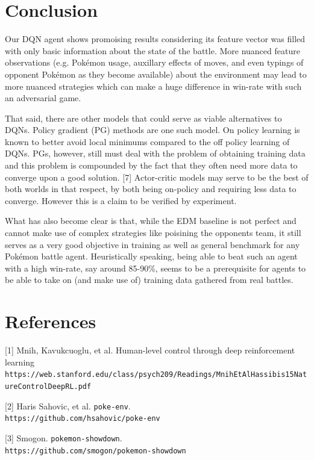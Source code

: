 \documentclass{article}
\begin{document}
\section{Conclusion}
Our DQN agent shows promoising results considering its feature vector was filled with only basic information about the state of the battle. More nuanced feature observations (e.g. Pokémon usage, auxillary effects of moves, and even typings of opponent Pokémon as they become available) about the environment may lead to more nuanced strategies which can make a huge difference in win-rate with such an adversarial game.

That said, there are other models that could serve as viable alternatives to DQNs. Policy gradient (PG) methods are one such model. On policy learning is known to better avoid local minimums compared to the off policy learning of DQNs. PGs, however, still must deal with the problem of obtaining training data and this problem is compounded by the fact that they often need more data to converge upon a good solution. [7] Actor-critic models may serve to be the best of both worlds in that respect, by both being on-policy and requiring less data to converge. However this is a claim to be verified by experiment.

What has also become clear is that, while the EDM baseline is not perfect and cannot make use of complex strategies like poisining the opponents team, it still serves as a very good objective in training as well as general benchmark for any Pokémon battle agent. Heuristically speaking, being able to beat such an agent with a high win-rate, say around 85-90\%, seems to be a prerequisite for agents to be able to take on (and make use of) training data gathered from real battles.

\section*{References}
\small
[1] Mnih, Kavukcuoglu, et al. Human-level control through deep reinforcement learning\\
\texttt{https://web.stanford.edu/class/psych209/Readings/MnihEtAlHassibis15NatureControlDeepRL.pdf}

[2] Haris Sahovic, et al. \texttt{poke-env}. \\
\texttt{https://github.com/hsahovic/poke-env}

[3] Smogon. \texttt{pokemon-showdown}. \\
\texttt{https://github.com/smogon/pokemon-showdown}
\end{document}
